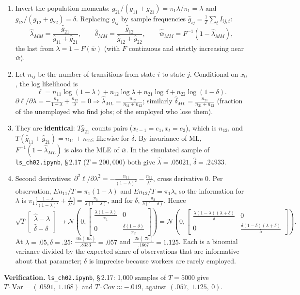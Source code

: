 \documentclass[12pt, letterpaper]{article}
\newcommand{\Var}{\mathrm{Var}}
\newcommand{\Cov}{\mathrm{Cov}}
\newcommand{\nb}[1]{\texttt{ls\_ch02.ipynb}, \S\,#1}
\begin{document}
\begin{tcolorbox}[oddbox,title={Exercise 2.17 \quad Lake Model}]
\begin{enumerate}
\item Invert the population moments: $g_{21}/(g_{11}+g_{21})=\pi_1\lambda/\pi_1=\lambda$ and
$g_{12}/(g_{12}+g_{22})=\delta$. Replacing $g_{ij}$ by sample frequencies
$\hat g_{ij}=\frac1T\sum_tI_{ij,t}$:
\[
\hat\lambda_{MM}=\frac{\hat g_{21}}{\hat g_{11}+\hat g_{21}},\qquad
\hat\delta_{MM}=\frac{\hat g_{12}}{\hat g_{12}+\hat g_{22}},\qquad
\hat{\bar w}_{MM}=F^{-1}(1-\hat\lambda_{MM}),
\]
the last from $\lambda=1-F(\bar w)$ (with $F$ continuous and strictly increasing near $\bar w$).
\item Let $n_{ij}$ be the number of transitions from state $i$ to state $j$. Conditional on $x_0$, the
log likelihood is
\[
\ell=n_{11}\log(1-\lambda)+n_{12}\log\lambda+n_{21}\log\delta+n_{22}\log(1-\delta).
\]
$\partial\ell/\partial\lambda=-\frac{n_{11}}{1-\lambda}+\frac{n_{12}}{\lambda}=0\Rightarrow
\boxed{\hat\lambda_{ML}=\frac{n_{12}}{n_{11}+n_{12}}}$; similarly
$\boxed{\hat\delta_{ML}=\frac{n_{21}}{n_{21}+n_{22}}}$ (fraction of the unemployed who find jobs; of
the employed who lose them).
\item They are \textbf{identical}: $T\hat g_{21}$ counts pairs ($x_{t-1}=e_1,x_t=e_2$), which is
$n_{12}$, and $T(\hat g_{11}+\hat g_{21})=n_{11}+n_{12}$; likewise for $\delta$. By invariance of ML,
$F^{-1}(1-\hat\lambda_{ML})$ is also the MLE of $\bar w$. In the simulated sample of \nb{2.17}
($T=200{,}000$) both give $\hat\lambda=.05021$, $\hat\delta=.24933$.
\item Second derivatives: $\partial^2\ell/\partial\lambda^2=-\frac{n_{11}}{(1-\lambda)^2}-\frac{n_{12}}{\lambda^2}$,
cross derivative $0$. Per observation, $E n_{11}/T=\pi_1(1-\lambda)$ and $En_{12}/T=\pi_1\lambda$, so
the information for $\lambda$ is
$\pi_1\big[\frac{1-\lambda}{(1-\lambda)^2}+\frac{\lambda}{\lambda^2}\big]=\frac{\pi_1}{\lambda(1-\lambda)}$,
and for $\delta$, $\frac{\pi_2}{\delta(1-\delta)}$. Hence
\[
\sqrt T\begin{bmatrix}\hat\lambda-\lambda\\ \hat\delta-\delta\end{bmatrix}\to
\mathcal N\!\left(0,\begin{bmatrix}\frac{\lambda(1-\lambda)}{\pi_1}&0\\0&\frac{\delta(1-\delta)}{\pi_2}\end{bmatrix}\right)
=\mathcal N\!\left(0,\begin{bmatrix}\frac{\lambda(1-\lambda)(\lambda+\delta)}{\delta}&0\\0&\frac{\delta(1-\delta)(\lambda+\delta)}{\lambda}\end{bmatrix}\right).
\]
At $\lambda=.05,\delta=.25$: $\frac{.05(.95)}{.8333}=\boxed{.057}$ and $\frac{.25(.75)}{.1667}=\boxed{1.125}$.
Each is a binomial variance divided by the expected share of observations that are informative
about that parameter; $\delta$ is imprecise because workers are rarely employed.
\end{enumerate}

\textbf{Verification.} \nb{2.17}: 1{,}000 samples of $T=5000$ give $T\cdot\Var=(.0591,\ 1.168)$ and
$T\cdot\Cov\approx-.019$, against $(.057,\ 1.125,\ 0)$. \checkmark
\end{tcolorbox}
\end{document}
